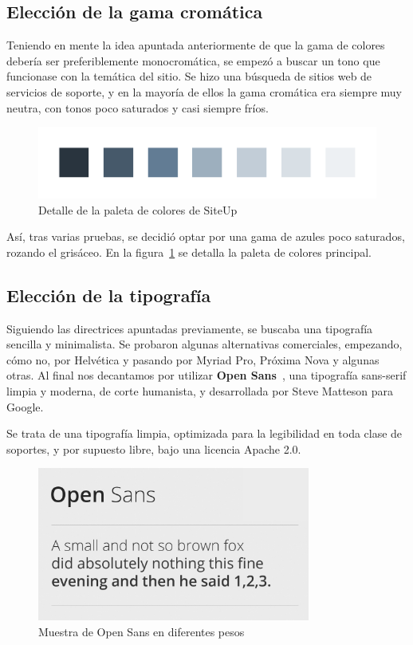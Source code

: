 \subsection{Elección de la gama cromática}

Teniendo en mente la idea apuntada anteriormente de que la gama de colores
debería ser preferiblemente monocromática, se empezó a buscar un tono que
funcionase con la temática del sitio. Se hizo una búsqueda de sitios web de
servicios de soporte, y en la mayoría de ellos la gama cromática era siempre muy
neutra, con tonos poco saturados y casi siempre fríos.

\begin{figure}[H]
  \centering
  \includegraphics[width=\textwidth]{5_diseno/paleta-colores}
  \caption{Detalle de la paleta de colores de SiteUp}
  \label{fig:colores}
\end{figure}

Así, tras varias pruebas, se decidió optar por una gama de azules poco
saturados, rozando el grisáceo. En la figura~\ref{fig:colores} se detalla la
paleta de colores principal.

\subsection{Elección de la tipografía}

Siguiendo las directrices apuntadas previamente, se buscaba una tipografía
sencilla y minimalista. Se probaron algunas alternativas comerciales, empezando,
cómo no, por Helvética y pasando por Myriad Pro, Próxima Nova y algunas
otras. Al final nos decantamos por utilizar \textbf{Open Sans}~\cite{open-sans},
una tipografía sans-serif limpia y moderna, de corte humanista, y desarrollada
por Steve Matteson para Google.

Se trata de una tipografía limpia, optimizada para la legibilidad en toda clase
de soportes, y por supuesto libre, bajo una licencia Apache 2.0.

\begin{figure}[H]
  \centering
  \includegraphics[width=0.8\textwidth]{5_diseno/open-sans}
  \caption{Muestra de Open Sans en diferentes pesos}
\end{figure}

